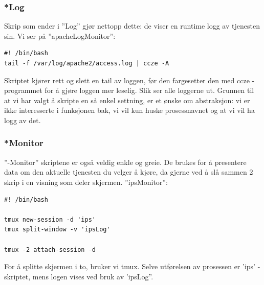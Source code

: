 \documentclass{article}
\begin{document}
\subsubsection{*Log}
Skrip som ender i ''Log'' gjør nettopp dette: de viser en runtime logg av tjenesten sin. Vi ser på ''apacheLogMonitor'':
\begin{lstlisting}
#! /bin/bash
tail -f /var/log/apache2/access.log | ccze -A
\end{lstlisting}
Skriptet kjører rett og slett en tail av loggen, før den fargesetter den med ccze - programmet for å gjøre loggen mer leselig.  Slik ser alle loggerne ut. Grunnen til at vi har valgt å skripte en så enkel settning, er et ønske om abstraksjon: vi er ikke interesserte i funksjonen bak, vi vil kun huske prosessnavnet og at vi vil ha logg av det. 
\subsubsection{*Monitor}
''-Monitor'' skriptene er også veldig enkle og greie. De brukes for å presentere data om den aktuelle tjenesten du velger å kjøre, da gjerne ved å slå sammen 2 skrip i en visning som deler skjermen. ''ipsMonitor'':
\begin{lstlisting}
#! /bin/bash

tmux new-session -d 'ips'
tmux split-window -v 'ipsLog'

tmux -2 attach-session -d
\end{lstlisting}
For å splitte skjermen i to, bruker vi tmux. Selve utførelsen av prosessen er 'ips' - skriptet, mens logen vises ved bruk av 'ipsLog''. 
\end{document}
